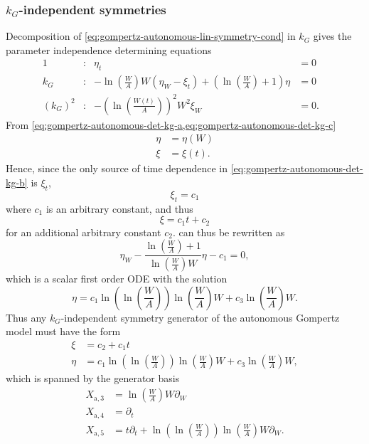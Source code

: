 \subsubsection{\texorpdfstring{\(k_G\)-independent symmetries}{Growth rate-independent symmetries}}

Decomposition of \cref{eq:gompertz-autonomous-lin-symmetry-cond} in \(k_G\) gives the parameter independence determining equations
\begin{subequations}
  \begin{flalign}
    1 & : & \eta_t &= 0 &\label{eq:gompertz-autonomous-det-kg-a}\\
    k_G & : & -\ln\left(\frac{W}{A}\right) W\left(\eta_W - \xi_t\right) + \left(\ln\left(\frac{W}{A}\right) + 1\right) \eta &= 0 &\label{eq:gompertz-autonomous-det-kg-b}\\
    (k_G)^2 & : & -\left(\ln\left(\frac{W(t)}{A}\right)\right)^2 W^2 \xi_W &= 0. &\label{eq:gompertz-autonomous-det-kg-c}
  \end{flalign}
\end{subequations}
From \cref{eq:gompertz-autonomous-det-kg-a,eq:gompertz-autonomous-det-kg-c}
\begin{align*}
  \eta &= \eta(W) \\
  \xi &= \xi(t).
\end{align*}
Hence, since the only source of time dependence in \cref{eq:gompertz-autonomous-det-kg-b} is \(\xi_t\),
\begin{equation*}
  \xi_t = c_1
\end{equation*}
where \(c_1\) is an arbitrary constant, and thus
\begin{equation*}
  \xi = c_1 t + c_2
\end{equation*}
for an additional arbitrary constant \(c_2\).
 can thus be rewritten as
\begin{equation*}
  \eta_W - \frac{\ln\left(\frac{W}{A}\right) + 1}{\ln\left(\frac{W}{A}\right) W} \eta - c_1 = 0,
\end{equation*}
which is a scalar first order ODE with the solution
\begin{equation*}
  \eta = c_1 \ln\left(\ln\left(\frac{W}{A}\right)\right) \ln\left(\frac{W}{A}\right) W + c_3 \ln\left(\frac{W}{A}\right) W.
\end{equation*}
Thus any \(k_G\)-independent symmetry generator of the autonomous Gompertz model  must have the form
\begin{align*}
  \xi &= c_2 + c_1 t \\
  \eta &= c_1 \ln\left(\ln\left(\frac{W}{A}\right)\right) \ln\left(\frac{W}{A}\right) W + c_3 \ln\left(\frac{W}{A}\right) W,
\end{align*}
which is spanned by the generator basis
\begin{align*}
  X_{\text{a},3} &= \ln\left(\frac{W}{A}\right) W \partial_W \\
  X_{\text{a},4} &= \partial_t \\
  X_{\text{a},5} &= t \partial_t + \ln\left(\ln\left(\frac{W}{A}\right)\right) \ln\left(\frac{W}{A}\right) W \partial_W.
\end{align*}

